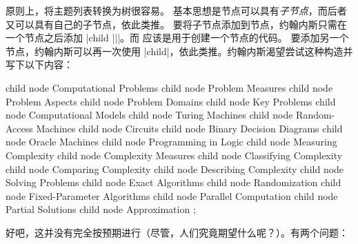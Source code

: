 原则上，将主题列表转换为\tikzname 树很容易。 基本思想是节点可以具有\emph{子节点}，而后者又可以具有自己的子节点，依此类推。 要将子节点添加到节点，约翰内斯只需在一个节点之后添加 |child {||}|。而  应该是用于创建一个节点的代码。 要添加另一个节点，约翰内斯可以再一次使用 |child|，依此类推。约翰内斯渴望尝试这种构造并写下以下内容：

%
\begin{codeexample}[]
\tikz
    child { node {Computational Problems}
      child { node {Problem Measures} }
      child { node {Problem Aspects} }
      child { node {Problem Domains} }
      child { node {Key Problems} }
    }
    child { node {Computational Models}
      child { node {Turing Machines} }
      child { node {Random-Access Machines} }
      child { node {Circuits} }
      child { node {Binary Decision Diagrams} }
      child { node {Oracle Machines} }
      child { node {Programming in Logic} }
    }
    child { node {Measuring Complexity}
      child { node {Complexity Measures} }
      child { node {Classifying Complexity} }
      child { node {Comparing Complexity} }
      child { node {Describing Complexity} }
    }
    child { node {Solving Problems}
      child { node {Exact Algorithms} }
      child { node {Randomization} }
      child { node {Fixed-Parameter Algorithms} }
      child { node {Parallel Computation} }
      child { node {Partial Solutions} }
      child { node {Approximation} }
    };
\end{codeexample}


好吧，这并没有完全按预期进行（尽管，人们究竟期望什么呢？）。有两个问题：

